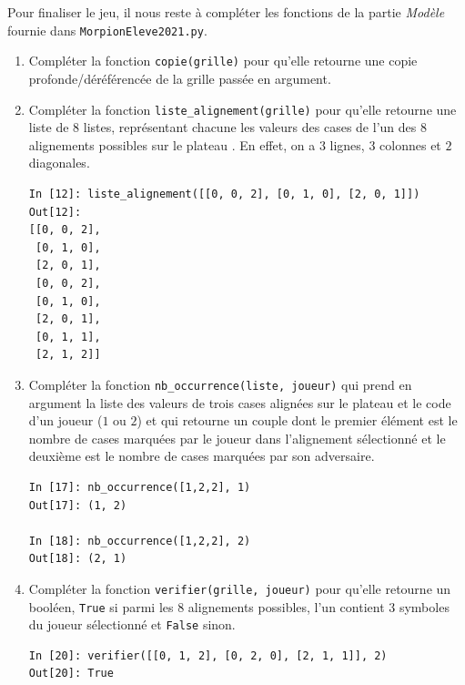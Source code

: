 \documentclass[a4paper, french, 12pt]{article}  %
\newcounter{exo}
\newcounter{exoB}
\newenvironment{exerciceB2}
{\par \bigskip  \noindent \addtocounter{exoB}{1} \hrulefill \quad { \large \textbf{Exercice \theexoB}} \quad \hrulefill \par \medskip }
{\par \bigskip }
\begin{document}
Pour finaliser le jeu, il nous reste à compléter les fonctions de la partie \textit{Modèle} fournie dans \lstinline+MorpionEleve2021.py+.


\begin{exerciceB2}{}



\begin{enumerate}

     \item Compléter la fonction \lstinline+copie(grille)+ pour qu'elle retourne une copie profonde/déréférencée de la grille passée en argument.
     
	  \item Compléter la fonction \lstinline+liste_alignement(grille)+ pour qu'elle  retourne une liste de $8$ listes, représentant chacune les valeurs des cases de l'un des $8$ alignements possibles sur le plateau . En effet, on a $3$ lignes, $3$ colonnes et $2$ diagonales.

\begin{lstlisting}
In [12]: liste_alignement([[0, 0, 2], [0, 1, 0], [2, 0, 1]])
Out[12]: 
[[0, 0, 2],
 [0, 1, 0],
 [2, 0, 1],
 [0, 0, 2],
 [0, 1, 0],
 [2, 0, 1],
 [0, 1, 1],
 [2, 1, 2]]
\end{lstlisting}


\item Compléter la fonction  \lstinline+nb_occurrence(liste, joueur)+ qui prend en argument la liste des valeurs de trois cases alignées sur le plateau et le code d'un joueur ($1$ ou $2$) et qui retourne un couple dont le premier élément est le nombre de cases marquées par le joueur dans l'alignement sélectionné et le deuxième est   le nombre de cases marquées par son adversaire.

\begin{lstlisting}
In [17]: nb_occurrence([1,2,2], 1)
Out[17]: (1, 2)

In [18]: nb_occurrence([1,2,2], 2)
Out[18]: (2, 1)
\end{lstlisting}

\item Compléter la  fonction \lstinline+verifier(grille, joueur)+ pour qu'elle retourne un booléen, \lstinline+True+ si parmi les $8$ alignements possibles, l'un contient $3$ symboles du joueur sélectionné et \lstinline+False+ sinon.

\begin{lstlisting}
In [20]: verifier([[0, 1, 2], [0, 2, 0], [2, 1, 1]], 2)
Out[20]: True
\end{lstlisting}
\end{enumerate}

\end{exerciceB2}




 
\end{document}
